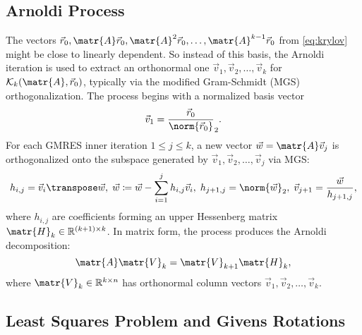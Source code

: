 \subsection{Arnoldi Process}
\label{sec:arnoldi-process}

The vectors \(\vec{r}_0, \matr{A}\vec{r}_0, \matr{A}^2\vec{r}_0, \dots, \matr{A}^{k - 1}\vec{r}_0\) from
\eqref{eq:krylov} might be close to linearly dependent. So instead of this
basis, the Arnoldi iteration is used to extract an orthonormal one \(\vec{v}_1,
\vec{v}_2, \dots, \vec{v}_k\) for \(\mathcal{K}_k(\matr{A}, \vec{r}_0)\),
typically via the modified Gram-Schmidt (MGS) orthogonalization. The process
begins with a normalized basis vector \[\vec{v}_1 =
  \frac{\vec{r}_0}{\norm{\vec{r}_0}}_2.\] For each GMRES inner iteration \(1 \le
j \le k\), a new vector \(\vec{w} = \matr{A} \vec{v}_j\) is orthogonalized onto
the subspace generated by \(\vec{v}_1, \vec{v}_2, \dots, \vec{v}_j\) via MGS:
\[h_{i,j} = \vec{v}_i\transpose \vec{w},\;\vec{w} \coloneq \vec{w} - \sum_{i = 1}^{j} h_{i,j}\vec{v}_i,\; h_{j+1,j} =
  \norm{\vec{w}}_2,\; \vec{v}_{j+1} = \frac{\vec{w}}{h_{j+1,j}},\] where
\(h_{i,j}\) are coefficients forming an upper Hessenberg matrix \(\matr{H}_k \in
\mathbb{R}^{(k+1) \times k}\). In matrix form, the process produces the Arnoldi
decomposition:
\begin{equation}
  \label{eq:arnoldi}
  \matr{A}\matr{V}_k = \matr{V}_{k+1} \matr{H}_k,
\end{equation}
where \(\matr{V}_{k} \in \mathbb{R}^{k \times n}\) has orthonormal column vectors
\(\vec{v}_1, \vec{v}_2, \dots, \vec{v}_k\).

\subsection{Least Squares Problem and Givens Rotations}
\label{sec:givens-rotat-least}

